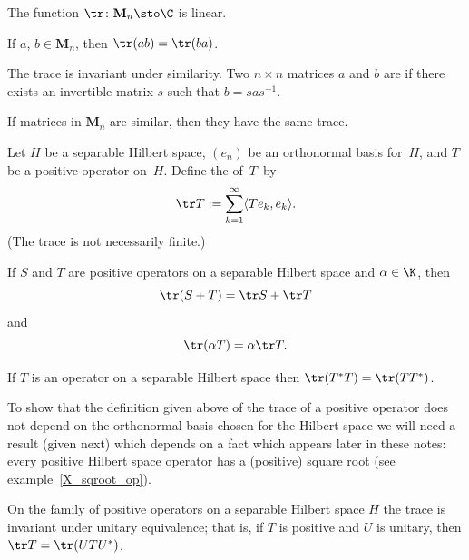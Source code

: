 \begin{prop}\label{tr0117} The function $\tr\colon \mathbf M_n \sto \C$ is linear.
\end{prop}

\begin{prop}\label{tr0121} If $a$, $b \in \mathbf M_n$, then $\tr (ab) = \tr (ba)$.
\end{prop}

The trace is invariant under similarity.  Two $n \times n$ matrices $a$ and $b$ are
 if there exists an invertible matrix $s$ such that $b = sas^{-1}$.

\begin{prop}\label{tr0124} If matrices in $\mathbf M_n$ are similar, then they have the same trace.
\end{prop}

\begin{defn}\label{tr0211} Let $H$ be a separable Hilbert space, $(e_n)$ be an orthonormal basis for~$H$, and $T$ be
a positive operator on~$H$.  Define the
 of~$T$~by
    \[ \tr T:=\sum_{k=1}^\infty \langle Te_k,e_k \rangle. \]
(The trace is not necessarily finite.)
\end{defn}

\begin{prop} If $S$ and $T$ are positive operators on a separable Hilbert space and $\alpha \in  \K$, then
   \[  \tr(S + T) = \tr S + \tr T \]
and
   \[ \tr(\alpha T) = \alpha \tr T. \]
\end{prop}

\begin{prop} If $T$ is an operator on a separable Hilbert space then $\tr(T^*T) = \tr(TT^*)$.
\end{prop}

To show that the definition given above of the trace of a positive operator does not depend on the orthonormal basis chosen for the
Hilbert space we will need a result (given next) which depends on a fact which appears later in these notes: every positive Hilbert
space operator has a (positive) square root (see example~\ref{X_sqroot_op}).

\begin{prop}\label{tr0221} On the family of positive operators on a separable Hilbert space $H$ the trace is invariant under unitary equivalence;
that is, if $T$ is positive and $U$ is unitary, then $\tr T = \tr(UTU^*)$.
\end{prop}

